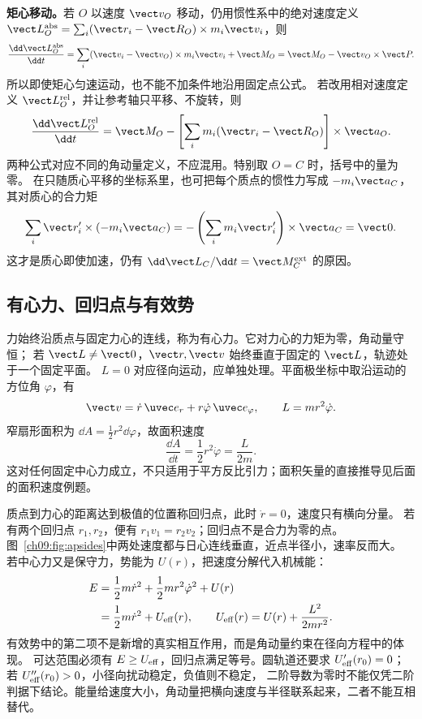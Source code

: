 \textbf{矩心移动。}若 $O$ 以速度 $\vect v_O$ 移动，仍用惯性系中的绝对速度定义
$\vect L_O^{\rm abs}=\sum_i(\vect r_i-\vect R_O)\times m_i\vect v_i$，则
\begin{equation}
 \frac{\dd\vect L_O^{\rm abs}}{\dd t}
 =\sum_i(\vect v_i-\vect v_O)\times m_i\vect v_i+\vect M_O
 =\vect M_O-\vect v_O\times\vect P.
\end{equation}
所以即使矩心匀速运动，也不能不加条件地沿用固定点公式。
若改用相对速度定义 $\vect L_O^{\rm rel}$，并让参考轴只平移、不旋转，则
\begin{equation}
 \frac{\dd\vect L_O^{\rm rel}}{\dd t}
 =\vect M_O-\left[\sum_i m_i(\vect r_i-\vect R_O)\right]\times\vect a_O.
\end{equation}
两种公式对应不同的角动量定义，不应混用。特别取 $O=C$ 时，括号中的量为零。
在只随质心平移的坐标系里，也可把每个质点的惯性力写成 $-m_i\vect a_C$，其对质心的合力矩
\begin{equation}
 \sum_i\vect r_i'\times(-m_i\vect a_C)
 =-\left(\sum_i m_i\vect r_i'\right)\times\vect a_C=\vect0.
\end{equation}
这才是质心即使加速，仍有 $\dd\vect L_C/\dd t=\vect M_C^{\rm ext}$ 的原因。

\subsection{有心力、回归点与有效势}
力始终沿质点与固定力心的连线，称为有心力。它对力心的力矩为零，角动量守恒；
若 $\vect L\ne\vect0$，$\vect r,\vect v$ 始终垂直于固定的 $\vect L$，轨迹处于一个固定平面。
$L=0$ 对应径向运动，应单独处理。平面极坐标中取沿运动的方位角 $\varphi$，有
\begin{equation}
 \vect v=\dot r\,\uvec e_r+r\dot\varphi\,\uvec e_\varphi,
 \qquad L=mr^2\dot\varphi.
\end{equation}
窄扇形面积为 $\dd A=\tfrac12r^2\dd\varphi$，故面积速度
\begin{equation}
 \frac{\dd A}{\dd t}=\frac12r^2\dot\varphi=\frac{L}{2m}.
\end{equation}
这对任何固定中心力成立，不只适用于平方反比引力；面积矢量的直接推导见后面的面积速度例题。

质点到力心的距离达到极值的位置称回归点，此时 $\dot r=0$，速度只有横向分量。
若有两个回归点 $r_1,r_2$，便有 $r_1v_1=r_2v_2$；回归点不是合力为零的点。
图~\ref{ch09:fig:apsides}中两处速度都与日心连线垂直，近点半径小，速率反而大。
\apsidesDiagram
若中心力又是保守力，势能为 $U(r)$，把速度分解代入机械能：
\begin{align}
 E&=\frac12m\dot r^2+\frac12mr^2\dot\varphi^2+U(r)\\
 &=\frac12m\dot r^2+U_{\rm eff}(r),
 \qquad U_{\rm eff}(r)=U(r)+\frac{L^2}{2mr^2}.
\end{align}
有效势中的第二项不是新增的真实相互作用，而是角动量约束在径向方程中的体现。
可达范围必须有 $E\ge U_{\rm eff}$，回归点满足等号。圆轨道还要求
$U'_{\rm eff}(r_0)=0$；若 $U''_{\rm eff}(r_0)>0$，小径向扰动稳定，负值则不稳定，
二阶导数为零时不能仅凭二阶判据下结论。能量给速度大小，角动量把横向速度与半径联系起来，二者不能互相替代。


